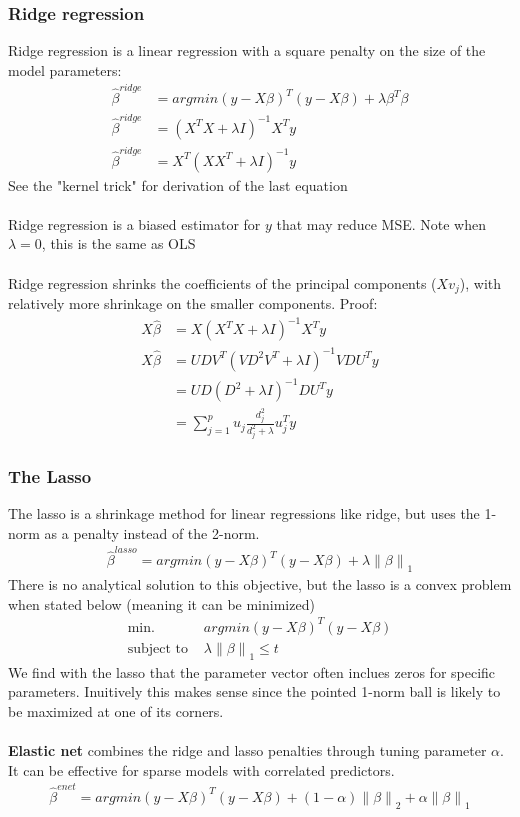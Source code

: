 \documentclass{article}
\newcommand{\norm}[2]{\left\lVert#1\right\rVert_#2}
\begin{document}
\subsubsection{Ridge regression}
Ridge regression is a linear regression with a square penalty on the size of the model parameters:
\begin{align*}
  \hat{\beta}^{ridge} &= argmin(y - X\beta)^T(y - X\beta) + \lambda\beta^T\beta\\
  \hat{\beta}^{ridge} &= (X^TX + \lambda I)^{-1}X^Ty\\
  \hat{\beta}^{ridge} &= X^T(XX^T + \lambda I)^{-1}y
\end{align*}
See the "kernel trick" for derivation of the last equation\\\\
Ridge regression is a biased estimator for $y$ that may reduce MSE. Note when $\lambda = 0$, this is the same as OLS\\\\
Ridge regression shrinks the coefficients of the principal components ($Xv_j$), with relatively more shrinkage on the smaller components. Proof:
\begin{align*}
  X\hat{\beta} &= X(X^TX + \lambda I)^{-1}X^Ty\\
  X\hat{\beta} &= UDV^T(VD^2V^T + \lambda I)^{-1}VDU^Ty\\
  &= UD(D^2 + \lambda I)^{-1}DU^Ty\\
  &= \sum_{j=1}^pu_j \frac{d_j^2}{d_j^2 + \lambda}u_j^Ty
\end{align*}

\subsubsection{The Lasso}
The lasso is a shrinkage method for linear regressions like ridge, but uses the 1-norm as a penalty instead of the 2-norm. 
\begin{align*}
  \hat{\beta}^{lasso} = argmin(y - X\beta)^T(y - X\beta) + \lambda \norm{\beta}{1}
\end{align*}
There is no analytical solution to this objective, but the lasso is a convex problem when stated below (meaning it can be minimized)
\begin{align*}
  \textrm{min. } & argmin(y - X\beta)^T(y - X\beta)\\
  \textrm{subject to } & \lambda \norm{\beta}{1} \leq t
\end{align*}
We find with the lasso that the parameter vector often inclues zeros for specific parameters. Inuitively this makes sense since the pointed 1-norm ball is likely to be maximized at one of its corners.\\\\
\textbf{Elastic net} combines the ridge and lasso penalties through tuning parameter $\alpha$. It can be effective for sparse models with correlated predictors.
\begin{align*}
  \hat{\beta}^{enet} = argmin(y - X\beta)^T(y - X\beta) + (1-\alpha) \norm{\beta}{2} + \alpha \norm{\beta}{1}
\end{align*}
\end{document}
